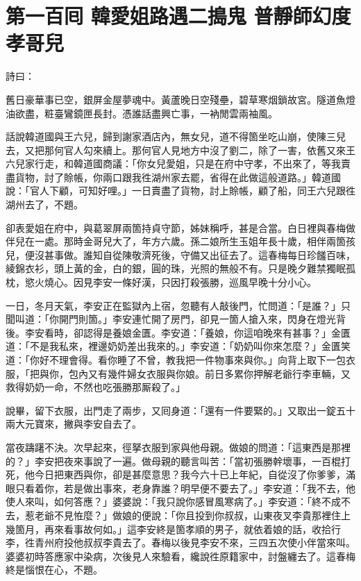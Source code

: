 
\chapter*{第一百囘 韓愛姐路遇二搗鬼 普靜師幻度孝哥兒}


詩曰：

舊日豪華事已空，銀屏金屋夢魂中。黃蘆晚日空殘壘，碧草寒烟鎖故宮。隧道魚燈油欲盡，粧臺鸞鏡匣長封。憑誰話盡興亡事，一衲閒雲兩袖風。

話說韓道國與王六兒，歸到謝家酒店內，無女兒，道不得箇坐吃山崩，使陳三兒去，又把那何官人勾來續上。那何官人見地方中沒了劉二，除了一害，依舊又來王六兒家行走，和韓道國商議：「你女兒愛姐，只是在府中守孝，不出來了，等我賣盡貨物，討了賒帳，你兩口跟我徃湖州家去罷，省得在此做這般道路。」韓道國說：「官人下顧，可知好哩。」{}一日賣盡了貨物，討上賒帳，顧了船，同王六兒跟徃湖州去了，不題。

卻表愛姐在府中，與葛翠屏兩箇持貞守節，姊妹稱呼，甚是合當。白日裡與春梅做伴兒在一處。那時金哥兒大了，年方六歲。孫二娘所生玉姐年長十歲，相伴兩箇孩兒，便沒甚事做。誰知自從陳敬濟死後，守備又出征去了。這春梅每日珍饈百味，綾錦衣衫，頭上黃的金，白的銀，圓的珠，光照的無般不有。只是晚夕難禁獨眠孤枕，慾火燒心。{}因見李安一條好漢，只因打殺張勝，巡風早晚十分小心。

一日，冬月天氣，李安正在監獄內上宿，忽聽有人敲後門，忙問道：「是誰？」只聞叫道：「你開門則箇。」李安連忙開了房門，卻見一箇人搶入來，閃身在燈光背後。李安看時，卻認得是養娘金匱。李安道：「養娘，你這咱晚來有甚事？」金匱道：「不是我私來，裡邊奶奶差出我來的。」李安道：「奶奶叫你來怎麼？」金匱笑道：「你好不理會得。看你睡了不曾，教我把一件物事來與你。」向背上取下一包衣服，「把與你，包內又有幾件婦女衣服與你娘。前日多累你押解老爺行李車輛，又救得奶奶一命，不然也吃張勝那厮殺了。」

說畢，留下衣服，出門走了兩步，又囘身道：「還有一件要緊的。」又取出一錠五十兩大元寶來，撇與李安自去了。

當夜躊躇不決。次早起來，徑拏衣服到家與他母親。做娘的問道：「這東西是那裡的？」李安把夜來事說了一遍。做母親的聽言叫苦：「當初張勝幹壞事，一百棍打死，他今日把東西與你，卻是甚麼意思？我今六十已上年紀，自從沒了你爹爹，滿眼只看着你，若是做出事來，老身靠誰？明早便不要去了。」{}李安道：「我不去，他使人來叫，如何答應？」婆婆說：「我只說你感冒風寒病了。」李安道：「終不成不去，惹老爺不見恠麼？」做娘的便說：「你且投到你叔叔，山東夜叉李貴那裡住上幾箇月，再來看事故何如。」這李安終是箇孝順的男子，就依着娘的話，收拾行李，徃青州府投他叔叔李貴去了。春梅以後見李安不來，三四五次使小伴當來叫。婆婆初時答應家中染病，次後見人來驗看，纔說徃原籍家中，討盤纏去了。這春梅終是惱恨在心，不題。

